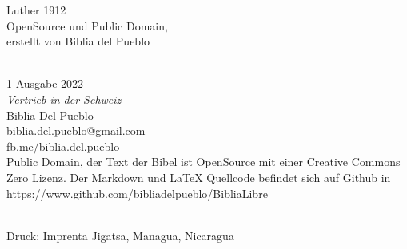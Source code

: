 \hfill\break
Luther 1912\\
OpenSource und Public Domain,\\
erstellt von Biblia del Pueblo\\
\strut \\
1 Ausgabe 2022~\\
\emph{Vertrieb in der Schweiz}\\
Biblia Del Pueblo\\
biblia.del.pueblo@gmail.com\\
fb.me/biblia.del.pueblo~\\
Public Domain, der Text der Bibel ist OpenSource mit einer Creative
Commons Zero Lizenz. Der Markdown und LaTeX Quellcode befindet sich auf
Github in\\
https://www.github.com/bibliadelpueblo/BibliaLibre\\
\strut \\
Druck: Imprenta Jigatsa, Managua, Nicaragua\\
